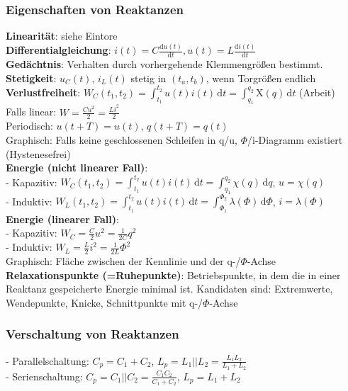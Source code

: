 \documentclass[fs, footer]{latex4ei}
\begin{document}
\begin{multicols*}{4}
    \subsubsection{Eigenschaften von Reaktanzen}
    \textbf{Linearität}: siehe Eintore\\
    \textbf{Differentialgleichung}: $i(t) = C \frac{\mathrm du(t)}{\mathrm dt}, u(t) = L \frac{\mathrm di(t)}{\mathrm dt}$\\
    \textbf{Gedächtnis}: Verhalten durch vorhergehende Klemmengrößen bestimmt.\\
    \textbf{Stetigkeit}: $u_C(t)$, $i_L(t)$ stetig in $(t_a, t_b)$, wenn Torgrößen endlich\\
    \textbf{Verlustfreiheit}: $W_C(t_1, t_2) = \int_{t_1}^{t_2}\! u(t)i(t)\,\mathrm dt = \int_{q_1}^{q_2}\! \mathrm{X}(q)\,\mathrm{d}t$ (Arbeit)\\
    Falls linear: $W = \frac{Cu^2}{2} = \frac{Li^2}{2}$\\
    Periodisch: $u(t+T) = u(t)$, $q(t+T) = q(t)$\\
    Graphisch: Falls keine geschlossenen Schleifen in q/u, $\Phi$/i-Diagramm existiert (Hystenesefrei)\\
    \textbf{Energie (nicht linearer Fall)}:\\
    - Kapazitiv: $W_C(t_1, t_2) = \int_{t_1}^{t_2} \! u(t)i(t)\, \mathrm dt = \int_{q_1}^{q_2} \! \chi(q)\, \mathrm dq$, $u=\chi(q)$\\
    - Induktiv: $W_L(t_1, t_2) = \int_{t_1}^{t_2} \! u(t)i(t)\, \mathrm dt = \int_{\Phi_1}^{\Phi_2} \! \lambda(\Phi)\, \mathrm d\Phi$, $i=\lambda(\Phi)$\\
    \textbf{Energie (linearer Fall)}:\\
    - Kapazitiv: $W_C = \frac{C}{2}u^2 = \frac{1}{2C}q^2$\\
    - Induktiv: $W_L = \frac{L}{2}i^2 = \frac{1}{2L} \Phi^2$\\
    Graphisch: Fläche zwischen der Kennlinie und der q-/$\Phi$-Achse\\
    \textbf{Relaxationspunkte (=Ruhepunkte)}: Betriebspunkte, in dem die in einer Reaktanz gespeicherte Energie minimal ist. Kandidaten sind: Extremwerte, Wendepunkte, Knicke, Schnittpunkte mit q-/$\Phi$-Achse\\
    \subsubsection{Verschaltung von Reaktanzen}
    - Parallelschaltung: $C_p = C_1 + C_2$, $L_p = L_1 || L_2 = \frac{L_1L_2}{L_1+L_2}$\\
    - Serienschaltung: $C_p = C_1 || C_2 = \frac{C_1C_2}{C_1+C_2}$, $L_p = L_1 + L_2$\\



\end{multicols*}
\end{document}
